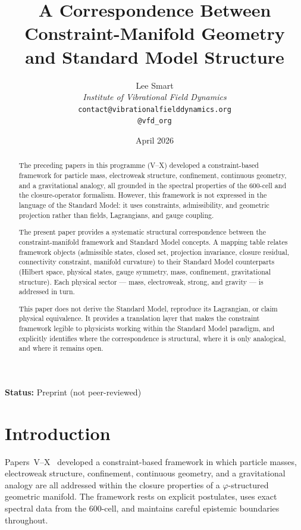 \documentclass[12pt]{article}
\title{A Correspondence Between Constraint-Manifold Geometry\\and Standard Model Structure}
\author{%
  Lee Smart\\[4pt]
  \textit{Institute of Vibrational Field Dynamics}\\[2pt]
  \texttt{contact@vibrationalfielddynamics.org}\\[2pt]
  \texttt{@vfd\_org}%
}
\date{April 2026}
\newcommand{\phig}{\varphi}
\begin{document}
\maketitle

\noindent\textbf{Status:} Preprint (not peer-reviewed)

\begin{abstract}
The preceding papers in this programme (V--X) developed a constraint-based framework for particle mass, electroweak structure, confinement, continuous geometry, and a gravitational analogy, all grounded in the spectral properties of the 600-cell and the closure-operator formalism. However, this framework is not expressed in the language of the Standard Model: it uses constraints, admissibility, and geometric projection rather than fields, Lagrangians, and gauge coupling.

The present paper provides a systematic structural correspondence between the constraint-manifold framework and Standard Model concepts. A mapping table relates framework objects (admissible states, closed set, projection invariance, closure residual, connectivity constraint, manifold curvature) to their Standard Model counterparts (Hilbert space, physical states, gauge symmetry, mass, confinement, gravitational structure). Each physical sector --- mass, electroweak, strong, and gravity --- is addressed in turn.

This paper does not derive the Standard Model, reproduce its Lagrangian, or claim physical equivalence. It provides a translation layer that makes the constraint framework legible to physicists working within the Standard Model paradigm, and explicitly identifies where the correspondence is structural, where it is only analogical, and where it remains open.
\end{abstract}

\section{Introduction}\label{sec:intro}

Papers~V--X~\citep{SmartV, SmartVI, SmartVII, SmartVIII, SmartIX, SmartX} developed a constraint-based framework in which particle masses, electroweak structure, confinement, continuous geometry, and a gravitational analogy are all addressed within the closure properties of a $\phig$-structured geometric manifold. The framework rests on explicit postulates, uses exact spectral data from the 600-cell, and maintains careful epistemic boundaries throughout.
\end{document}
